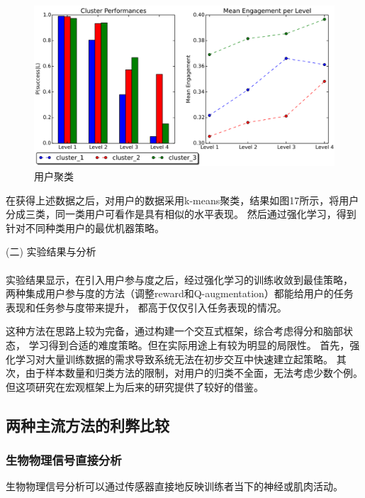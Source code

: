 \documentclass[12pt]{article}
\begin{document}
            \begin{figure}[H]
            	
            	\centering
            	\includegraphics[scale=0.6]{images/user_model.png}
            	\caption{用户聚类}
            	\label{fig:label}
            \end{figure}
            在获得上述数据之后，对用户的数据采用k-means聚类，结果如图17所示，将用户分成三类，同一类用户可看作是具有相似的水平表现。
            然后通过强化学习，得到针对不同种类用户的最优机器策略。

            (二) 实验结果与分析\paragraph{}
            实验结果显示，在引入用户参与度之后，经过强化学习的训练收敛到最佳策略，
            两种集成用户参与度的方法（调整reward和Q-augmentation）都能给用户的任务表现和任务参与度带来提升，
            都高于仅仅引入任务表现的情况。

            这种方法在思路上较为完备，通过构建一个交互式框架，综合考虑得分和脑部状态，
            学习得到合适的难度策略。但在实际用途上有较为明显的局限性。
            首先，强化学习对大量训练数据的需求导致系统无法在初步交互中快速建立起策略。
            其次，由于样本数量和归类方法的限制，对用户的归类不全面，无法考虑少数个例。
            但这项研究在宏观框架上为后来的研究提供了较好的借鉴。
            \subsection{两种主流方法的利弊比较}
            \subsubsection{生物物理信号直接分析}
            生物物理信号分析可以通过传感器直接地反映训练者当下的神经或肌肉活动。
\end{document}

